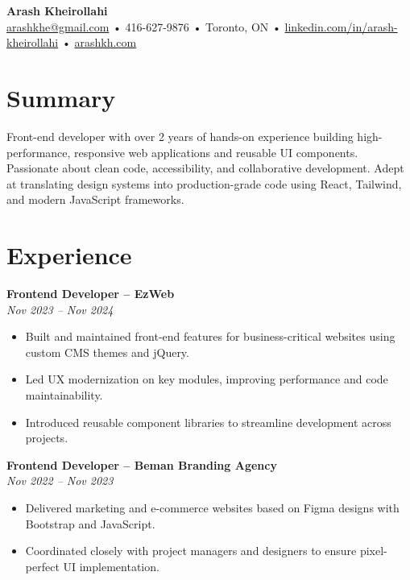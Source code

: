 \documentclass[letterpaper,11pt]{article}
\begin{document}

{\LARGE \textbf{Arash Kheirollahi}}\\
\href{mailto:arashkhe@gmail.com}{arashkhe@gmail.com} • 416-627-9876 • Toronto, ON • \href{https://linkedin.com/in/arash-kheirollahi}{linkedin.com/in/arash-kheirollahi} • \href{https://arashkh.com}{arashkh.com}

\vspace{1.2em}

\section*{Summary}
Front-end developer with over 2 years of hands-on experience building high-performance, responsive web applications and reusable UI components. Passionate about clean code, accessibility, and collaborative development. Adept at translating design systems into production-grade code using React, Tailwind, and modern JavaScript frameworks.

\vspace{0.6em}

\section*{Experience}
\textbf{Frontend Developer – EzWeb}\\
\textit{Nov 2023 -- Nov 2024}\\
\begin{itemize}[leftmargin=*]
  \item Built and maintained front-end features for business-critical websites using custom CMS themes and jQuery.
  \item Led UX modernization on key modules, improving performance and code maintainability.
  \item Introduced reusable component libraries to streamline development across projects.
\end{itemize}

\vspace{0.6em}

\textbf{Frontend Developer – Beman Branding Agency}\\
\textit{Nov 2022 -- Nov 2023}\\
\begin{itemize}[leftmargin=*]
  \item Delivered marketing and e-commerce websites based on Figma designs with Bootstrap and JavaScript.
  \item Coordinated closely with project managers and designers to ensure pixel-perfect UI implementation.
\end{itemize}
\end{document}
